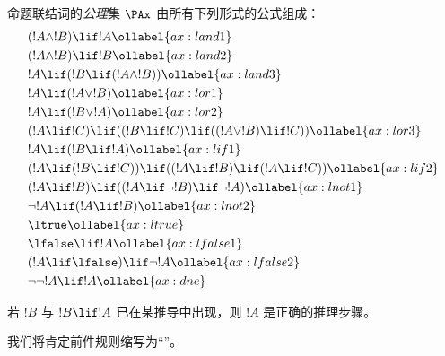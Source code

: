 \documentclass[../../../include/open-logic-section]{subfiles}
\begin{document}
      {}
      {}


\begin{defn}[公理]
命题联结词的\emph{公理}集 $\PAx$ 由所有下列形式的公式组成：
\begin{align}
  & (!A \land !B) \lif !A \ollabel{ax:land1}\\
  & (!A \land !B) \lif !B \ollabel{ax:land2}\\
  & !A \lif (!B \lif (!A \land !B)) \ollabel{ax:land3}\\
  & !A \lif (!A \lor !B) \ollabel{ax:lor1}\\
  & !A \lif (!B \lor !A) \ollabel{ax:lor2}\\
  & (!A \lif !C) \lif ((!B \lif !C) \lif ((!A \lor !B) \lif !C)) \ollabel{ax:lor3}\\
  & !A \lif (!B \lif !A) \ollabel{ax:lif1}\\
  & (!A \lif (!B \lif !C)) \lif ((!A \lif !B) \lif (!A \lif !C)) \ollabel{ax:lif2}\\
  & (!A \lif !B) \lif ((!A \lif \lnot !B) \lif \lnot !A) \ollabel{ax:lnot1}\\
  & \lnot !A \lif (!A \lif !B) \ollabel{ax:lnot2}\\
  & \ltrue \ollabel{ax:ltrue}\\
  & \lfalse \lif !A \ollabel{ax:lfalse1}\\
  & (!A \lif \lfalse) \lif \lnot !A \ollabel{ax:lfalse2}\\
  & \lnot\lnot !A \lif !A \ollabel{ax:dne}
\end{align}
\end{defn}

\begin{defn}[肯定前件]
  若 $!B$ 与 $!B \lif !A$ 已在某推导中出现，则 $!A$ 是正确的推理步骤。
\end{defn}

我们将肯定前件规则缩写为“\MP”。
\end{document}
